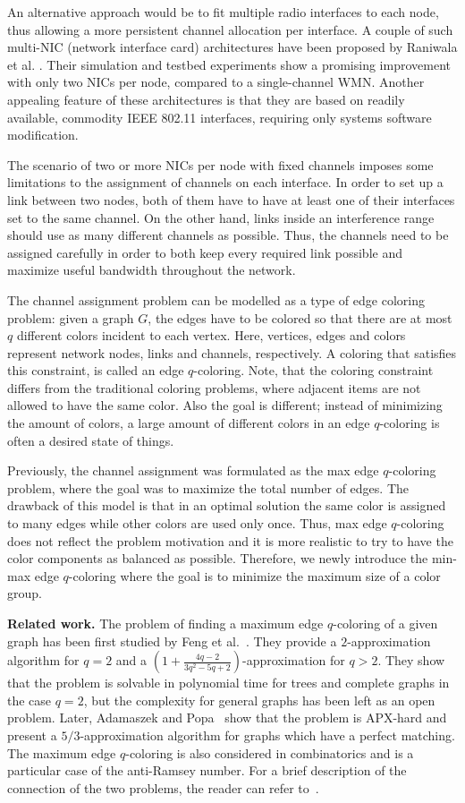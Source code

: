 \documentclass[runningheads, a4paper]{llncs}
\begin{document}
An alternative approach would be to fit multiple radio interfaces to each node, thus allowing a more persistent channel allocation per interface. A couple of such multi-NIC (network interface card) architectures have been proposed by Raniwala et al. \cite{RaniwalaGC04,RaniwalaC05}. Their simulation and testbed experiments show a promising improvement with only two NICs per node, compared to a single-channel WMN. Another appealing feature of these architectures is that they are based on readily available, commodity IEEE 802.11 interfaces, requiring only systems software modification. 

The scenario of two or more NICs per node with fixed channels imposes some limitations to the assignment of channels on each interface. In order to set up a link between two nodes, both of them have to have at least one of their interfaces set to the same channel. On the other hand, links inside an interference range should use as many different channels as possible. Thus, the channels need to be assigned carefully in order to both keep every required link possible and maximize useful bandwidth throughout the network.

The channel assignment problem can be modelled as a type of edge coloring problem: given a graph $G$, the edges have to be colored so that there are at most $q$ different colors incident to each vertex. Here, vertices, edges and colors represent network nodes, links and channels, respectively. A coloring that satisfies this constraint, is called an edge $q$-coloring. Note, that the coloring constraint differs from the traditional coloring problems, where adjacent items are not allowed to have the same color. Also the goal is different; instead of minimizing the amount of colors, a large amount of different colors in an edge $q$-coloring is often a desired state of things.

Previously, the channel assignment was formulated as the max edge $q$-coloring problem, where the goal was to maximize the total number of edges. The drawback of this model is that in an optimal solution the same color is assigned to many edges while other colors are used only once. Thus, max edge $q$-coloring does not reflect the problem motivation and it is more realistic to try to have the color components as balanced as possible. Therefore, we newly introduce the min-max edge $q$-coloring where the goal is to minimize the maximum size of a color group.

\textbf{Related work.} The problem of finding a maximum edge $q$-coloring of a given graph has been first studied by Feng et al.~\cite{FengZQW07,FengCZ08,FengZW09}. They provide a $2$-approximation algorithm for $q=2$ and a $(1+\frac{4q-2}{3q^2-5q+2})$-approximation for $q > 2$. They show that the problem is solvable in polynomial time for trees and complete graphs in the case $q=2$, but the complexity for general graphs has been left as an open problem. Later, Adamaszek and Popa~\cite{AP10} show that the problem is APX-hard and present a $5/3$-approximation algorithm for graphs which have a perfect matching.
The maximum edge $q$-coloring is also considered in combinatorics and is a particular case of the anti-Ramsey number. For a brief description of the connection of the two problems, the reader can refer to~\cite{AP10}.
\end{document}
